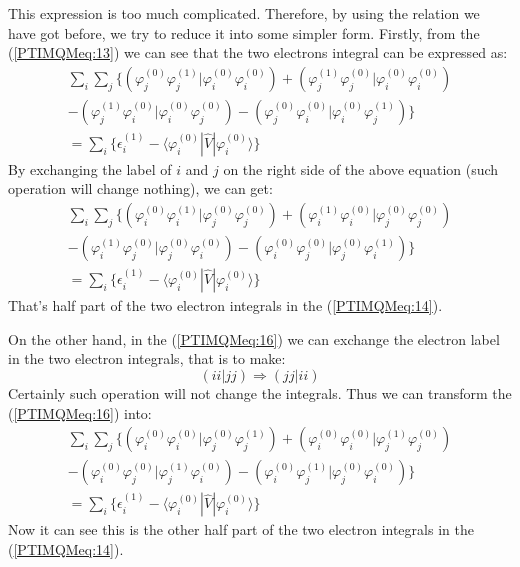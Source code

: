 This expression is too much complicated. Therefore, by using the
relation we have got before, we try to reduce it into some simpler
form. Firstly, from the (\ref{PTIMQMeq:13}) we can see that the two
electrons integral can be expressed as:
\begin{multline}\label{PTIMQMeq:16}
\sum_{i}\sum_{j}\Bigg\{
\left(\varphi^{(0)}_{j}\varphi^{(1)}_{j}|\varphi^{(0)}_{i}\varphi^{(0)}_{i}\right)
+
\left(\varphi^{(1)}_{j}\varphi^{(0)}_{j}|\varphi^{(0)}_{i}\varphi^{(0)}_{i}\right)
\\
-
\left(\varphi^{(1)}_{j}\varphi^{(0)}_{i}|\varphi^{(0)}_{i}\varphi^{(0)}_{j}\right)
-
\left(\varphi^{(0)}_{j}\varphi^{(0)}_{i}|\varphi^{(0)}_{i}\varphi^{(1)}_{j}\right)
\Bigg\} \\
= \sum_{i}\Bigg\{\epsilon^{(1)}_{i} -
\langle\varphi^{(0)}_{i}|\hat{V}|\varphi^{(0)}_{i}\rangle\Bigg\}
\end{multline}
By exchanging the label of $i$ and $j$ on the right side of the
above equation (such operation will change nothing), we can get:
\begin{multline}\label{PTIMQMeq:15}
\sum_{i}\sum_{j}\Bigg\{
\left(\varphi^{(0)}_{i}\varphi^{(1)}_{i}|\varphi^{(0)}_{j}\varphi^{(0)}_{j}\right)
+
\left(\varphi^{(1)}_{i}\varphi^{(0)}_{i}|\varphi^{(0)}_{j}\varphi^{(0)}_{j}\right)
\\
-
\left(\varphi^{(1)}_{i}\varphi^{(0)}_{j}|\varphi^{(0)}_{j}\varphi^{(0)}_{i}\right)
-
\left(\varphi^{(0)}_{i}\varphi^{(0)}_{j}|\varphi^{(0)}_{j}\varphi^{(1)}_{i}\right)
\Bigg\} \\
= \sum_{i}\Bigg\{\epsilon^{(1)}_{i} -
\langle\varphi^{(0)}_{i}|\hat{V}|\varphi^{(0)}_{i}\rangle\Bigg\}
\end{multline}
That's half part of the two electron integrals in the
(\ref{PTIMQMeq:14}).

On the other hand, in the (\ref{PTIMQMeq:16}) we can exchange the
electron label in the two electron integrals, that is to make:
\begin{equation}\label{}
(ii|jj) \Rightarrow (jj|ii)
\end{equation}
Certainly such operation will not change the integrals. Thus we can
transform the (\ref{PTIMQMeq:16}) into:
\begin{multline}\label{PTIMQMeq:17}
\sum_{i}\sum_{j}\Bigg\{
\left(\varphi^{(0)}_{i}\varphi^{(0)}_{i}|\varphi^{(0)}_{j}\varphi^{(1)}_{j}\right)
+
\left(\varphi^{(0)}_{i}\varphi^{(0)}_{i}|\varphi^{(1)}_{j}\varphi^{(0)}_{j}\right)
\\
-
\left(\varphi^{(0)}_{i}\varphi^{(0)}_{j}|\varphi^{(1)}_{j}\varphi^{(0)}_{i}\right)
-
\left(\varphi^{(0)}_{i}\varphi^{(1)}_{j}|\varphi^{(0)}_{j}\varphi^{(0)}_{i}\right)
\Bigg\} \\
= \sum_{i}\Bigg\{\epsilon^{(1)}_{i} -
\langle\varphi^{(0)}_{i}|\hat{V}|\varphi^{(0)}_{i}\rangle\Bigg\}
\end{multline}
Now it can see this is the other half part of the two electron
integrals in the (\ref{PTIMQMeq:14}).

